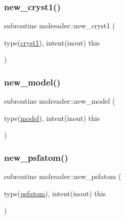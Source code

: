 \mbox{\label{namespacemolreader_ac284dc33f40874d6156c1cd36781002c}} 
\subsubsection{\texorpdfstring{new\+\_\+cryst1()}{new\_cryst1()}}
{\footnotesize\ttfamily subroutine molreader\+::new\+\_\+cryst1 (\begin{DoxyParamCaption}\item[{type(\hyperlink{structmolreader_1_1cryst1}{cryst1}), intent(inout)}]{this }\end{DoxyParamCaption})\hspace{0.3cm}{\ttfamily [private]}}

\mbox{\label{namespacemolreader_a8edb660b2e1b64a5d78593c734afbe95}} 
\subsubsection{\texorpdfstring{new\+\_\+model()}{new\_model()}}
{\footnotesize\ttfamily subroutine molreader\+::new\+\_\+model (\begin{DoxyParamCaption}\item[{type(\hyperlink{structmolreader_1_1model}{model}), intent(inout)}]{this }\end{DoxyParamCaption})\hspace{0.3cm}{\ttfamily [private]}}

\mbox{\label{namespacemolreader_a56968311293e3c68022fe3bbe3600306}} 
\subsubsection{\texorpdfstring{new\+\_\+psfatom()}{new\_psfatom()}}
{\footnotesize\ttfamily subroutine molreader\+::new\+\_\+psfatom (\begin{DoxyParamCaption}\item[{type(\hyperlink{structmolreader_1_1psfatom}{psfatom}), intent(inout)}]{this }\end{DoxyParamCaption})\hspace{0.3cm}{\ttfamily [private]}}

